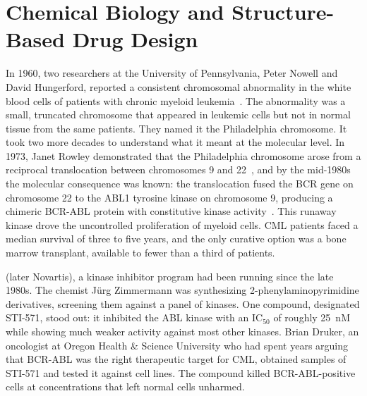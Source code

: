 \chapter{Chemical Biology and Structure-Based Drug Design}
\label{ch:drug-design}

In 1960, two researchers at the University of Pennsylvania, Peter Nowell and David Hungerford, reported a consistent chromosomal abnormality in the white blood cells of patients with chronic myeloid leukemia~\cite{nowell1960}. The abnormality was a small, truncated chromosome that appeared in leukemic cells but not in normal tissue from the same patients. They named it the Philadelphia chromosome. It took two more decades to understand what it meant at the molecular level. In 1973, Janet Rowley demonstrated that the Philadelphia chromosome arose from a reciprocal translocation between chromosomes 9 and 22~\cite{rowley1973}, and by the mid-1980s the molecular consequence was known: the translocation fused the BCR gene on chromosome 22 to the ABL1 tyrosine kinase on chromosome 9, producing a chimeric BCR-ABL protein with constitutive kinase activity~\cite{shtivelman1985}. This runaway kinase drove the uncontrolled proliferation of myeloid cells. CML patients faced a median survival of three to five years, and the only curative option was a bone marrow transplant, available to fewer than a third of patients.

 (later Novartis), a kinase inhibitor program had been running since the late 1980s. The chemist J\"urg Zimmermann was synthesizing 2-phenylaminopyrimidine derivatives, screening them against a panel of kinases. One compound, designated STI-571, stood out: it inhibited the ABL kinase with an IC$_{50}$ of roughly 25~nM while showing much weaker activity against most other kinases. Brian Druker, an oncologist at Oregon Health \& Science University who had spent years arguing that BCR-ABL was the right therapeutic target for CML, obtained samples of STI-571 and tested it against cell lines. The compound killed BCR-ABL-positive cells at concentrations that left normal cells unharmed.

